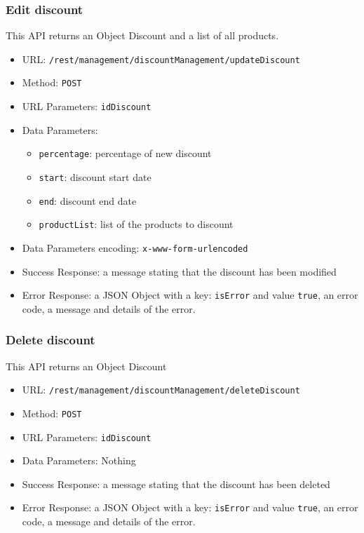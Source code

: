 \subsubsection*{Edit discount}
This API returns an Object Discount and a list of all products.

\begin{itemize}
    \item URL: \texttt{/rest/management/discountManagement/updateDiscount}
    \item Method: \texttt{POST}
    \item URL Parameters: \texttt{idDiscount}
    \item Data Parameters: 
    \begin{itemize}
        \item \texttt{percentage}: percentage of new discount
        \item \texttt{start}: discount start date
        \item \texttt{end}: discount end date
        \item \texttt{productList}: list of the products to discount
    \end{itemize}
    \item Data Parameters encoding: \texttt{x-www-form-urlencoded}
    \item Success Response: a message stating that the discount has been modified
    \item Error Response: a JSON Object with a key: \texttt{isError}  and value \texttt{true}, an error code, a message and details of the error.
\end{itemize}

\subsubsection*{Delete discount}
This API returns an Object Discount

\begin{itemize}
    \item URL: \texttt{/rest/management/discountManagement/deleteDiscount}
    \item Method: \texttt{POST}
    \item URL Parameters: \texttt{idDiscount}
    \item Data Parameters: Nothing
    \item Success Response: a message stating that the discount has been deleted
    \item Error Response: a JSON Object with a key: \texttt{isError}  and value \texttt{true}, an error code, a message and details of the error.
\end{itemize}

